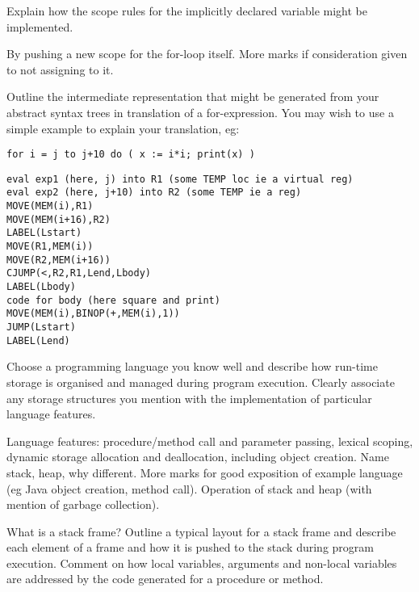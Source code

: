 \documentclass[11pt]{cityexam}
\begin{document}
\begin{questions}
\begin{subquestions}
\subquestion
Explain how the scope rules for the implicitly declared variable might
be implemented.

\begin{modelanswer}
By pushing a new scope for the for-loop itself. More marks if consideration
given to not assigning to it.
\end{modelanswer}

\subquestion
        Outline the intermediate representation
        that might be generated from your
	abstract syntax trees in translation of
        a for-expression.
	You may wish to use a simple example to explain your 
	translation, eg:
\begin{verbatim}
for i = j to j+10 do ( x := i*i; print(x) )
\end{verbatim}

\begin{modelanswer}
\begin{verbatim}
eval exp1 (here, j) into R1 (some TEMP loc ie a virtual reg)
eval exp2 (here, j+10) into R2 (some TEMP ie a reg)
MOVE(MEM(i),R1)
MOVE(MEM(i+16),R2)
LABEL(Lstart)
MOVE(R1,MEM(i))
MOVE(R2,MEM(i+16))
CJUMP(<,R2,R1,Lend,Lbody)
LABEL(Lbody)
code for body (here square and print)
MOVE(MEM(i),BINOP(+,MEM(i),1))
JUMP(Lstart)
LABEL(Lend)
\end{verbatim}
\end{modelanswer}

\end{subquestions}

\question


\begin{subquestions}

\subquestion
Choose a programming language you know well and describe
how run-time storage is organised and managed during program 
execution.
Clearly associate any storage structures you
mention with the implementation of particular 
language features.

\begin{modelanswer}
Language features: procedure/method call and parameter passing,
lexical scoping, dynamic storage allocation and deallocation,
including object creation. Name stack, heap, why different.
More marks for good exposition of example language
(eg Java object creation, method call). Operation of
stack and heap (with mention of garbage collection).
\end{modelanswer}


\subquestion
What is a stack frame?
Outline a typical layout for a stack frame and describe 
each element of a frame and how it is pushed to the stack during
program execution. 
Comment on how local variables, arguments and non-local variables
are addressed by the code generated for a procedure or method. 


\end{subquestions}
\end{questions}
\end{document}
